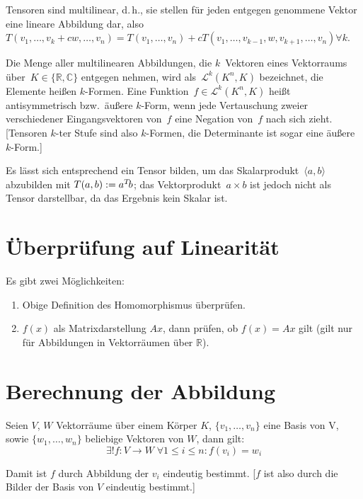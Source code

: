 Tensoren sind multilinear, d.\,h., sie stellen für jeden entgegen genommene Vektor eine lineare Abbildung dar, also~$T(v_1, \ldots, v_k + cw, \ldots, v_n) = T(v_1, \ldots, v_n) + cT(v_1, \ldots, v_{k-1}, w, v_{k+1}, \ldots, v_n) \forall k$.

Die Menge aller multilinearen Abbildungen, die $k$~Vektoren eines Vektorraums über~$K \in \{\mathbb R, \mathbb C\}$ entgegen nehmen, wird als~$\mathcal L^k(K^n, K)$ bezeichnet, die Elemente heißen $k$-Formen. Eine Funktion~$f \in \mathcal L^k(K^n, K)$ heißt antisymmetrisch bzw.~äußere $k$-Form, wenn jede Vertauschung zweier verschiedener Eingangsvektoren von~$f$ eine Negation von~$f$ nach sich zieht. [Tensoren $k$-ter Stufe sind also $k$-Formen, die Determinante ist sogar eine äußere $k$-Form.]

Es lässt sich entsprechend ein Tensor bilden, um das Skalarprodukt~$\langle a, b \rangle$ abzubilden mit $T(a,b) := a\T b$; das Vektorprodukt~$a \times b$ ist jedoch nicht als Tensor darstellbar, da das Ergebnis kein Skalar ist.

\section{Überprüfung auf Linearität}

Es gibt zwei Möglichkeiten:
\begin{enumerate}
  \item Obige Definition des Homomorphismus überprüfen.
  \item $f(x)$ als Matrixdarstellung $Ax$, dann prüfen, ob $f(x)=Ax$ gilt (gilt nur für Abbildungen in Vektorräumen über $\mathbb{R}$).
\end{enumerate}

\section{Berechnung der Abbildung}

Seien $V$, $W$ Vektorräume über einem Körper $K$, $\{v_1,\ldots,v_n\}$ eine Basis von V, sowie $\{w_1,\ldots,w_n\}$ beliebige Vektoren von $W$, dann gilt:
\[ \exists! f:V \to W\;\forall1\leq i\leq n:f(v_{i})=w_{i} \]

Damit ist $f$ durch Abbildung der $v_i$ eindeutig bestimmt.
[$f$ ist also durch die Bilder der Basis von $V$ eindeutig bestimmt.]


